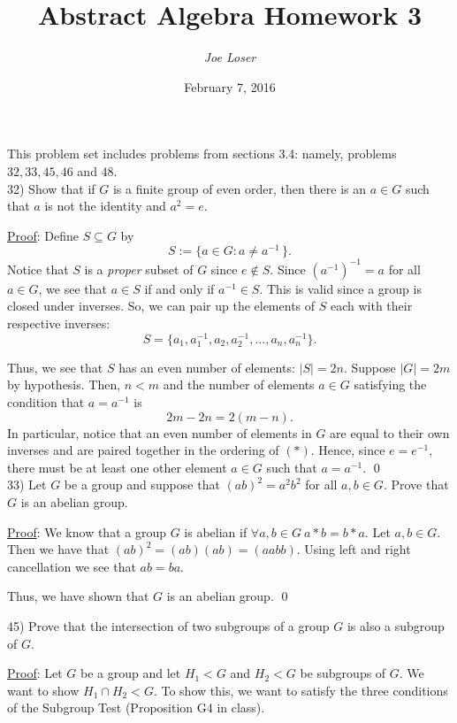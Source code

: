 \documentclass{article}
\title{Abstract Algebra Homework 3}
\author{\textit{Joe Loser}}
\date{February 7, 2016}
\begin{document}
\maketitle

This problem set includes problems from sections 3.4: namely, problems $32, 33, 45, 46$ and $48$.\\

32) Show that if $G$ is a finite group of even order, then there is an $a \in G$ such that $a$ is not the identity and $a^{2} = e$.

\underline{Proof}: Define $S \subseteq G$ by 
	$$ S := \{a \in G : a \neq a^{-1}\,\}. $$
Notice that $S$ is a \textit{proper} subset of $G$ since $e \notin S.$ Since $(a^{-1})^{-1} = a$ for all $a \in G$, we see that $a \in S$ if and only if $a^{-1} \in S$. This is valid since a group is closed under inverses. So, we can pair up the elements of $S$ each with their respective inverses:
\begin{equation}
	S = \{a_1, a_1^{-1}, a_2, a_2^{-1}, ..., a_n, a_n^{-1}\} \tag{*}. 
\end{equation}

Thus, we see that $S$ has an even number of elements: $\lvert S \rvert = 2n$. Suppose $\lvert G \rvert = 2m$ by hypothesis. Then, $n < m$ and the number of elements $a \in G$ satisfying the condition that $a = a^{-1}$ is
	$$2m - 2n = 2(m - n) .$$
In particular, notice that an even number of elements in $G$ are equal to their own inverses and are paired together in the ordering of $(*)$. Hence, since $e = e^{-1}$, there must be at least one other element $a \in G$ such that $a = a^{-1}$.	 \qed \\

33) Let $G$ be a group and suppose that $(ab)^{2} = a^{2}b^{2}$ for all $a, b \in G$. Prove that $G$ is an abelian group. 

\underline{Proof}: We know that a group $G$ is abelian if  $\forall a, b \in G \ a * b = b * a. $ Let $a, b \in G$. Then we have that $(ab)^2 = (ab)(ab) = (aabb)$. Using left and right cancellation we see that $ab = ba$.

Thus, we have shown that $G$ is an abelian group. \qed \pagebreak

45) Prove that the intersection of two subgroups of a group $G$ is also a subgroup of $G.$

\underline{Proof}: Let $G$ be a group and let $H_1 < G$ and $H_2 < G$ be subgroups of $G$. We want to show $H_1 \cap H_2 < G. $ To show this, we want to satisfy the three conditions of the Subgroup Test (Proposition G4 in class). 
\end{document}
